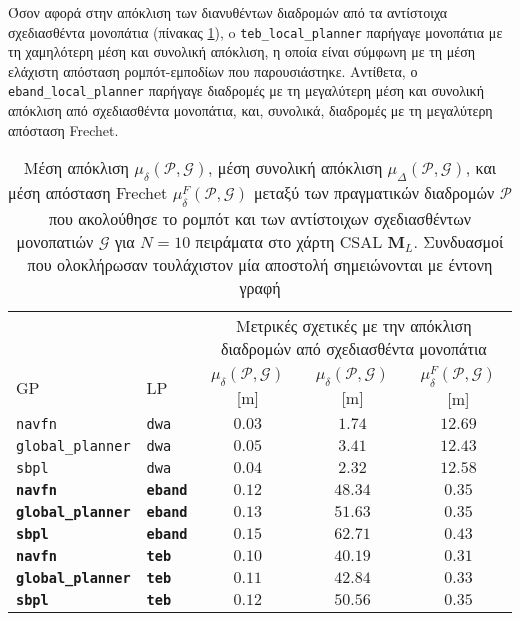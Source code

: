 Όσον αφορά στην απόκλιση των διανυθέντων διαδρομών από τα αντίστοιχα
σχεδιασθέντα μονοπάτια (πίνακας
\ref{tbl:info_deviation_from_global_plan_csal}), o \texttt{teb\_local\_planner}
παρήγαγε μονοπάτια με τη χαμηλότερη μέση και συνολική απόκλιση, η οποία είναι
σύμφωνη με τη μέση ελάχιστη απόσταση ρομπότ-εμποδίων που παρουσιάστηκε.
Αντίθετα, ο \texttt{eband\_local\_planner} παρήγαγε διαδρομές με τη μεγαλύτερη
μέση και συνολική απόκλιση από σχεδιασθέντα μονοπάτια, και, συνολικά, διαδρομές
με τη μεγαλύτερη απόσταση Frechet.

\begin{table}[h]\hspace{-1.5cm}
\renewcommand{\arraystretch}{1.3}
\begin{tabular}{llccc}
& & \multicolumn{3}{c}{Μετρικές σχετικές με την απόκλιση διαδρομών από σχεδιασθέντα μονοπάτια} \\
\cline{3-5}
  GP & LP & $\mu_{\delta}(\bm{\mathcal{P}},\bm{\mathcal{G}})$ [m] & $\mu_{\delta}(\bm{\mathcal{P}},\bm{\mathcal{G}})$ [m] & $\mu_{\delta}^F(\bm{\mathcal{P}},\bm{\mathcal{G}})$ [m] \\ \toprule
  \texttt{navfn} & \texttt{dwa} & $0.03$ & $1.74$ & $12.69$ \\
  \texttt{global\_planner} & \texttt{dwa} & $0.05$ & $3.41$ & $12.43$ \\
  \texttt{sbpl} & \texttt{dwa} & $0.04$ & $2.32$ & $12.58$ \\
  \textbf{\texttt{navfn}} & \textbf{\texttt{eband}} & $\bm{0.12}$ & $\bm{48.34}$ & $\bm{0.35}$ \\
  \textbf{\texttt{global\_planner}} & \textbf{\texttt{eband}} & $\bm{0.13}$ & $\bm{51.63}$ & $\bm{0.35}$ \\
  \textbf{\texttt{sbpl}} & \textbf{\texttt{eband}} & $\bm{0.15}$ & $\bm{62.71}$ & $\bm{0.43}$ \\
  \textbf{\texttt{navfn}} & \textbf{\texttt{teb}} & $\bm{0.10}$ & $\bm{40.19}$ & $\bm{0.31}$ \\
  \textbf{\texttt{global\_planner}} & \textbf{\texttt{teb}} & $\bm{0.11}$ & $\bm{42.84}$ & $\bm{0.33}$ \\
  \textbf{\texttt{sbpl}} & \textbf{\texttt{teb}} & $\bm{0.12}$ & $\bm{50.56}$ & $\bm{0.35}$ \\ \bottomrule
\end{tabular}
\caption{\small Μέση απόκλιση $\mu_{\delta}(\bm{\mathcal{P}},\bm{\mathcal{G}})$,
         μέση συνολική απόκλιση
         $\mu_{\Delta}(\bm{\mathcal{P}},\bm{\mathcal{G}})$, και μέση απόσταση
         Frechet $\mu_{\delta}^F(\bm{\mathcal{P}},\bm{\mathcal{G}})$ μεταξύ των
         πραγματικών διαδρομών $\bm{\mathcal{P}}$ που ακολούθησε το ρομπότ και
         των αντίστοιχων σχεδιασθέντων μονοπατιών $\bm{\mathcal{G}}$ για $N=10$
         πειράματα στο χάρτη CSAL $\bm{M}_L$. Συνδυασμοί που
         ολοκλήρωσαν τουλάχιστον μία αποστολή σημειώνονται με έντονη γραφή}
\label{tbl:info_deviation_from_global_plan_csal}
\end{table}
